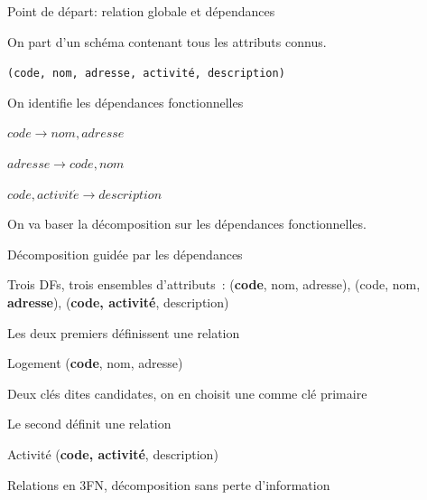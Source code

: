 
\begin{frame}{Point de départ: relation globale et dépendances}

On part d'un schéma contenant tous les attributs connus.

\vfill
\centerline{\texttt{(code, nom, adresse, activité, description)}}
\vfill

On identifie les dépendances fonctionnelles

\begin{redbullet}
  \item $code \to nom, adresse$
  \item $adresse \to code, nom$
 \item $code, activit\acute{e}  \to  description$
\end{redbullet}

\vfill

On va baser la décomposition sur les dépendances fonctionnelles.

\end{frame}


\begin{frame}{Décomposition guidée par les dépendances}

Trois DFs, trois ensembles d'attributs
\,: (\textbf{code}, nom, adresse), (code, nom, \textbf{adresse}), (\textbf{code, activité}, description)

\vfill

\begin{redbullet}
  \item  Les deux premiers définissent une relation 
  
\smallskip  
      \centerline{Logement (\textbf{code}, nom, adresse)}
\smallskip
   Deux clés dites \alert{candidates},   on en choisit une comme \alert{clé primaire}
 \item Le second définit une relation 
 
\medskip

 \centerline{Activité (\textbf{code, activité}, description)}
 
\end{redbullet}

\vfill
Relations en 3FN, décomposition \alert{sans perte d'information}



\end{frame}

